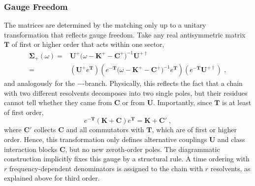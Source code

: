 \documentclass[aip,jcp,reprint,noshowkeys,superscriptaddress]{revtex4-2}
\theoremstyle{plain}
\theoremstyle{definition}
\theoremstyle{remark}
\begin{document}
\subsubsection{Gauge Freedom}
The matrices are determined by the matching only up to a unitary transformation that reflects gauge freedom.\cite{tarantelli1992configuration} Take any real antisymmetric matrix $\mathbf{T}$ of first or higher order that acts within one sector,
\begin{equation}
  \begin{aligned}
\pmb{\Sigma}_{+}(\omega) = & \mathbf{U}^{+}\big(\omega-\mathbf{K}^{+}-\mathbf{C}^{+}\big)^{-1}\mathbf{U}^{+\dagger} \\
= & 
\left(
\mathbf{U}^{+}e^{\mathbf{T}}\right) 
\left(
e^{-\mathbf{T}}\big(\omega-\mathbf{K}^{+}-\mathbf{C}^{+}\big)^{-1}
e^{\mathbf{T}}
\right)
\left(
e^{-\mathbf{T}}
\mathbf{U}^{+\dagger}
\right) \;,
  \end{aligned}
\label{eq:si:gauge}
\end{equation}
and analogously for the $-$-branch. Physically, this reflects the fact that a chain with two different resolvents decomposes into two single poles, but their residues cannot tell whether they came from $\mathbf{C}$ or from $\mathbf{U}$. Importantly, since $\mathbf{T}$ is at least of first order,
\begin{equation}
  e^{-\mathbf{T}}(\mathbf{K}+\mathbf{C})e^{\mathbf{T}} = \mathbf{K}+\mathbf{C}' \;,
\label{eq:si:gaugeK}
\end{equation}
where $\mathbf{C}'$ collects $\mathbf{C}$ and all commutators with $\mathbf{T}$, which are of first or higher order. Hence, this transformation only defines alternative couplings $\mathbf{U}$ and class interaction blocks $\mathbf{C}$, but no new zeroth-order poles. The diagrammatic construction implicitly fixes this gauge by a structural rule. A time ordering with $r$ frequency-dependent denominators is assigned to the chain with $r$ resolvents, as explained above for third order.
\end{document}
